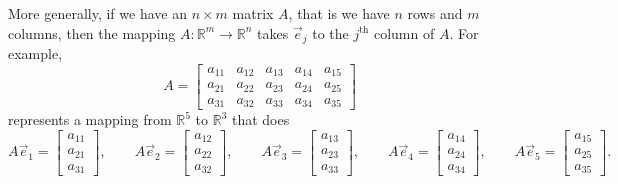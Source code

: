 \documentclass{ximera}
\begin{document}
More generally, if we have an $n \times m$ matrix $A$, that is we have $n$ rows and $m$ columns, then the mapping $A \colon {\mathbb R}^m \to {\mathbb R}^n$ takes $\vec{e}_j$ to the $j^{\text{th}}$ column of $A$. For example,
\begin{equation*}
    A = 
    \begin{bmatrix}
        a_{11} & a_{12} & a_{13} & a_{14} & a_{15} \\
        a_{21} & a_{22} & a_{23} & a_{24} & a_{25} \\
        a_{31} & a_{32} & a_{33} & a_{34} & a_{35}
    \end{bmatrix}
\end{equation*}
represents a mapping from ${\mathbb R}^5$ to ${\mathbb R}^3$ that does
\begin{equation*}
    A \vec{e}_1 =
    \begin{bmatrix}
        a_{11} \\ a_{21} \\ a_{31}
    \end{bmatrix} ,
    \qquad A \vec{e}_2 =
    \begin{bmatrix}
        a_{12} \\ a_{22} \\ a_{32}
    \end{bmatrix} ,
    \qquad A \vec{e}_3 =
    \begin{bmatrix}
        a_{13} \\ a_{23} \\ a_{33}
    \end{bmatrix} ,
    \qquad A \vec{e}_4 =
    \begin{bmatrix}
        a_{14} \\ a_{24} \\ a_{34}
    \end{bmatrix} ,
    \qquad A \vec{e}_5 =
    \begin{bmatrix}
        a_{15} \\ a_{25} \\ a_{35}
    \end{bmatrix} .
\end{equation*}
\end{document}
